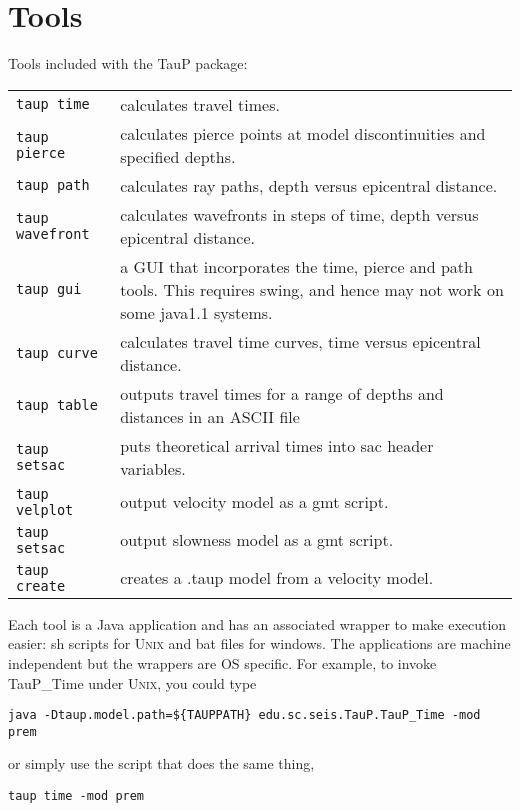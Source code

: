 
\section{Tools}

Tools included with the TauP package:

\begin{center}
\begin{tabular}{lp{3.2in}}

\texttt{taup time} &
  calculates travel times. \\
\texttt{taup pierce} &
  calculates pierce points at model discontinuities and specified depths. \\
\texttt{taup path} & calculates ray paths, depth versus epicentral distance. \\
\texttt{taup wavefront} & calculates wavefronts in steps of time, depth versus epicentral distance. \\
\texttt{taup gui} & a GUI that incorporates the time, pierce and path tools. This
requires swing, and hence may not work on some java1.1 systems. \\
\texttt{taup curve} &
  calculates travel time curves, time versus epicentral distance. \\
\texttt{taup table} & outputs travel times for a range of depths and distances in an ASCII file \\
\texttt{taup setsac} &
  puts theoretical arrival times into sac header variables. \\
\texttt{taup velplot} &
  output velocity model as a gmt script. \\
\texttt{taup setsac} &
  output slowness model as a gmt script. \\
\texttt{taup create} &
  creates a .taup model from a velocity model. \\
\end{tabular}
\end{center}

Each tool is a Java application and has an associated wrapper to make
execution easier: sh scripts
for \textsc{Unix} and
bat files for windows.  The applications are machine independent but the
wrappers are OS specific.
For example, to invoke TauP\_Time under \textsc{Unix}, you could type

\texttt{java -Dtaup.model.path=\$\{TAUPPATH\} edu.sc.seis.TauP.TauP\_Time -mod prem}

or simply use the script that does the same thing,

\texttt{taup time -mod prem}

